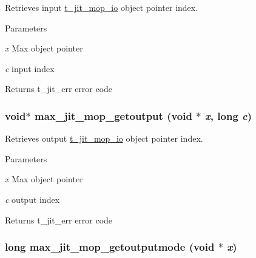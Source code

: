 Retrieves input \hyperlink{structt__jit__mop__io}{t\_\-jit\_\-mop\_\-io} object pointer index. 
\begin{DoxyParams}{Parameters}
\item[{\em x}]Max object pointer \item[{\em c}]input index\end{DoxyParams}
\begin{DoxyReturn}{Returns}
t\_\-jit\_\-err error code 
\end{DoxyReturn}
\hypertarget{group__maxmopmod_ga4cc6070d8e9d74882ecfbeb7b244266f}{
\subsubsection[{max\_\-jit\_\-mop\_\-getoutput}]{\setlength{\rightskip}{0pt plus 5cm}void$\ast$ max\_\-jit\_\-mop\_\-getoutput (void $\ast$ {\em x}, \/  long {\em c})}}
\label{group__maxmopmod_ga4cc6070d8e9d74882ecfbeb7b244266f}


Retrieves output \hyperlink{structt__jit__mop__io}{t\_\-jit\_\-mop\_\-io} object pointer index. 
\begin{DoxyParams}{Parameters}
\item[{\em x}]Max object pointer \item[{\em c}]output index\end{DoxyParams}
\begin{DoxyReturn}{Returns}
t\_\-jit\_\-err error code 
\end{DoxyReturn}
\hypertarget{group__maxmopmod_gad8eb4eab73dc45290345b80f7ec31ec3}{
\subsubsection[{max\_\-jit\_\-mop\_\-getoutputmode}]{\setlength{\rightskip}{0pt plus 5cm}long max\_\-jit\_\-mop\_\-getoutputmode (void $\ast$ {\em x})}}
\label{group__maxmopmod_gad8eb4eab73dc45290345b80f7ec31ec3}


